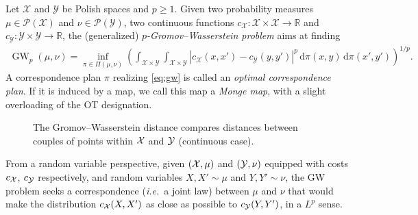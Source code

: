         \begin{defi}[generalized GW]\label{def:gw}
            Let $\mathcal{X}$ and $\mathcal{Y}$ be Polish spaces and $p\geq 1$. Given two probability measures $\mu \in\mathcal{P}(\mathcal{X})$ and $\nu \in\mathcal{P}(\mathcal{Y})$, two continuous functions $c_{\mathcal{X}}:\mathcal{X}\times \mathcal{X}\to \mathbb{R}$ and $c_{\mathcal{Y}}:\mathcal{Y}\times \mathcal{Y}\to \mathbb{R}$, the (generalized) $p$\emph{-Gromov--Wasserstein problem} aims at finding
            \begin{align*}
                \tag{GW}
                \operatorname{GW}_p(\mu,\nu)=\inf_{\pi \in \Pi(\mu,\nu)} \left( \int _{\mathcal{X}\times \mathcal{Y}}\int _{\mathcal{X}\times \mathcal{Y}}|c_{\mathcal{X}}(x,x')-c_{\mathcal{Y}}(y,y')|^p \, \mathrm d\pi(x,y)\, \mathrm d\pi(x',y')\right)^{1/p}.
                \label{eq:gw}
            \end{align*}
            A correspondence plan $\pi$ realizing \cref{eq:gw} is called an \emph{optimal correspondence plan}. If it is induced by a map, we call this map a \emph{Monge map}, with a slight overloading of the OT designation.
        \end{defi}
        \begin{figure}[!h]
            \centering
            
            \caption{The Gromov--Wasserstein distance compares distances between couples of points within $\mathcal{X}$ and $\mathcal{Y}$ (continuous case).}
            \label{fig:gw-cont}
        \end{figure}
        From a random variable perspective, given $(\mathcal{X},\mu)$ and $(\mathcal{Y},\nu)$ equipped with costs $c_{\mathcal{X}}$, $c_{\mathcal{Y}}$ respectively, and random variables $X,X' \sim \mu$ and $Y,Y' \sim \nu$, the GW problem seeks a correspondence (\textit{i.e.}~a joint law) between $\mu$ and $\nu$ that would make the distribution $c_{\mathcal{X}}(X,X')$ as close as possible to $c_{\mathcal{Y}}(Y,Y')$, in a $L^p$ sense.


